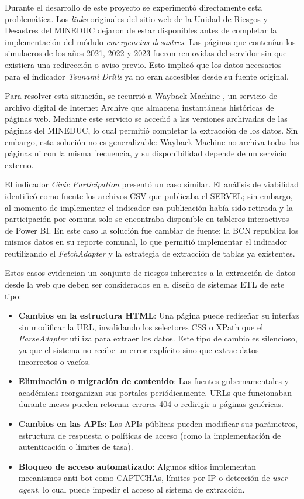 \documentclass[12pt,letterpaper,oneside]{report}
\begin{document}
Durante el desarrollo de este proyecto se experiment\'o directamente esta problem\'atica. Los \textit{links} originales del sitio web de la Unidad de Riesgos y Desastres del MINEDUC dejaron de estar disponibles antes de completar la implementaci\'on del m\'odulo \textit{emergencias-desastres}. Las p\'aginas que conten\'ian los simulacros de los a\~nos 2021, 2022 y 2023 fueron removidas del servidor sin que existiera una redirecci\'on o aviso previo. Esto implic\'o que los datos necesarios para el indicador \textit{Tsunami Drills} ya no eran accesibles desde su fuente original.

Para resolver esta situaci\'on, se recurri\'o a Wayback Machine \parencite{waybackmachine}, un servicio de archivo digital de Internet Archive que almacena instant\'aneas hist\'oricas de p\'aginas web. Mediante este servicio se accedi\'o a las versiones archivadas de las p\'aginas del MINEDUC, lo cual permiti\'o completar la extracci\'on de los datos. Sin embargo, esta soluci\'on no es generalizable: Wayback Machine no archiva todas las p\'aginas ni con la misma frecuencia, y su disponibilidad depende de un servicio externo.

El indicador \textit{Civic Participation} present\'o un caso similar. El an\'alisis de viabilidad identific\'o como fuente los archivos CSV que publicaba el SERVEL; sin embargo, al momento de implementar el indicador esa publicaci\'on hab\'ia sido retirada y la participaci\'on por comuna solo se encontraba disponible en tableros interactivos de Power BI. En este caso la soluci\'on fue cambiar de fuente: la BCN republica los mismos datos en su reporte comunal, lo que permiti\'o implementar el indicador reutilizando el \textit{FetchAdapter} y la estrategia de extracci\'on de tablas ya existentes.

Estos casos evidencian un conjunto de riesgos inherentes a la extracci\'on de datos desde la web que deben ser considerados en el dise\~no de sistemas ETL de este tipo:

\begin{itemize}
  \item \textbf{Cambios en la estructura HTML}: Una p\'agina puede redise\~nar su interfaz sin modificar la URL, invalidando los selectores CSS o XPath que el \textit{ParseAdapter} utiliza para extraer los datos. Este tipo de cambio es silencioso, ya que el sistema no recibe un error expl\'icito sino que extrae datos incorrectos o vac\'ios.
  \item \textbf{Eliminaci\'on o migraci\'on de contenido}: Las fuentes gubernamentales y acad\'emicas reorganizan sus portales peri\'odicamente. URLs que funcionaban durante meses pueden retornar errores 404 o redirigir a p\'aginas gen\'ericas.
  \item \textbf{Cambios en las APIs}: Las APIs p\'ublicas pueden modificar sus par\'ametros, estructura de respuesta o pol\'iticas de acceso (como la implementaci\'on de autenticaci\'on o l\'imites de tasa).
  \item \textbf{Bloqueo de acceso automatizado}: Algunos sitios implementan mecanismos anti-bot como CAPTCHAs, l\'imites por IP o detecci\'on de \textit{user-agent}, lo cual puede impedir el acceso al sistema de extracci\'on.
\end{itemize}
\end{document}
